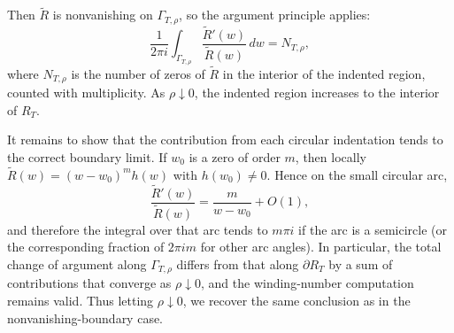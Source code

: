 \documentclass[11pt]{amsart}
\theoremstyle{definition}
\theoremstyle{remark}
\begin{document}
Then $\widetilde R$ is nonvanishing on $\Gamma_{T,\rho}$, so the argument principle applies:
\[
\frac{1}{2\pi i}\int_{\Gamma_{T,\rho}} \frac{\widetilde R'(w)}{\widetilde R(w)}\,dw
=
N_{T,\rho},
\]
where $N_{T,\rho}$ is the number of zeros of $\widetilde R$ in the interior of the indented region,
counted with multiplicity. As $\rho\downarrow0$, the indented region increases to the interior of $R_T$.

It remains to show that the contribution from each circular indentation tends to the correct boundary
limit. If $w_0$ is a zero of order $m$, then locally
$\widetilde R(w)=(w-w_0)^m h(w)$ with $h(w_0)\neq0$. Hence on the small circular arc,
\[
\frac{\widetilde R'(w)}{\widetilde R(w)}=\frac{m}{w-w_0}+O(1),
\]
and therefore the integral over that arc tends to $m\pi i$ if the arc is a semicircle (or the
corresponding fraction of $2\pi i m$ for other arc angles). In particular, the total change of argument
along $\Gamma_{T,\rho}$ differs from that along $\partial R_T$ by a sum of contributions that converge
as $\rho\downarrow0$, and the winding-number computation remains valid. Thus letting $\rho\downarrow0$,
we recover the same conclusion as in the nonvanishing-boundary case.
\end{document}
